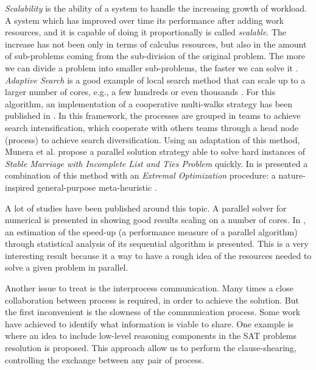 \textit{Scalability} is the ability of a system to handle the increasing growth of workload. A system which has improved over time its performance after adding work resources, and it is capable of doing it proportionally is called {\it scalable}. The increase has not been only in terms of calculus resources, but also in the amount of sub-problems coming from the sub-division of the original problem. The more we can divide a problem into smaller sub-problems, the faster we can solve it \cite{Hill}. \textit{Adaptive Search} is a good example of local search method that can scale up to a larger number of cores, e.g., a few hundreds or even thousands \cite{Diaz}. For this algorithm, an implementation of a cooperative multi-walks strategy has been published in \cite{Munera}. In this framework, the processes are grouped in teams to achieve search intensification, which cooperate with others teams through a head node (process) to achieve search diversification. Using an adaptation of this method, Munera et al. propose a parallel solution strategy able to solve hard instances of \textit{Stable Marriage with Incomplete List and Ties Problem} quickly. In \cite{Munera2016} is presented a combination of this method with an \textit{Extremal Optimization} procedure: a nature-inspired general-purpose meta-heuristic \cite{Boettcher2000}. 

A lot of studies have been published around this topic. A parallel solver for numerical \csps{} is presented in \cite{Ishii2014} showing good results scaling on a number of cores. In \cite{Truchet02}, an estimation of the speed-up (a performance measure of a parallel algorithm) through statistical analysis of its sequential algorithm is presented. This is a very interesting result because it a way to have a rough idea of the resources needed to solve a given problem in parallel.

Another issue to treat is the interprocess communication. Many times a close collaboration between process is required, in order to achieve the solution. But the first inconvenient is the slowness of the communication process. Some work have achieved to identify what information is viable to share. One example is \cite{Hamadi2012} where an idea to include low-level reasoning components in the SAT problems resolution is proposed. This approach allow us to perform the clause-shearing, controlling the exchange between any pair of process.

